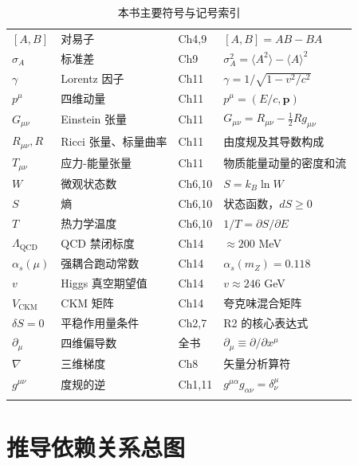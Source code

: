 \documentclass[11pt,a4paper,openany]{book}
\begin{document}
\begin{center}
\begin{longtable}{p{2cm}p{4cm}p{2cm}p{5.5cm}}
$[A,B]$ & 对易子 & Ch4,9 & $[A,B]=AB-BA$ \\
$\sigma_A$ & 标准差 & Ch9 & $\sigma_A^2=\langle A^2\rangle-\langle A\rangle^2$ \\
$\gamma$ & Lorentz 因子 & Ch11 & $\gamma=1/\sqrt{1-v^2/c^2}$ \\
$p^\mu$ & 四维动量 & Ch11 & $p^\mu=(E/c,\mathbf{p})$ \\
$G_{\mu\nu}$ & Einstein 张量 & Ch11 & $G_{\mu\nu}=R_{\mu\nu}-\frac{1}{2}Rg_{\mu\nu}$ \\
$R_{\mu\nu}, R$ & Ricci 张量、标量曲率 & Ch11 & 由度规及其导数构成 \\
$T_{\mu\nu}$ & 应力-能量张量 & Ch11 & 物质能量动量的密度和流 \\
$W$ & 微观状态数 & Ch6,10 & $S=k_B\ln W$ \\
$S$ & 熵 & Ch6,10 & 状态函数，$dS\ge 0$ \\
$T$ & 热力学温度 & Ch6,10 & $1/T=\partial S/\partial E$ \\
$\Lambda_{\text{QCD}}$ & QCD 禁闭标度 & Ch14 & $\approx 200$ MeV \\
$\alpha_s(\mu)$ & 强耦合跑动常数 & Ch14 & $\alpha_s(m_Z)=0.118$ \\
$v$ & Higgs 真空期望值 & Ch14 & $v\approx 246$ GeV \\
$V_{\text{CKM}}$ & CKM 矩阵 & Ch14 & 夸克味混合矩阵 \\
$\delta S=0$ & 平稳作用量条件 & Ch2,7 & R2 的核心表达式 \\
$\partial_\mu$ & 四维偏导数 & 全书 & $\partial_\mu\equiv\partial/\partial x^\mu$ \\
$\nabla$ & 三维梯度 & Ch8 & 矢量分析算符 \\
$g^{\mu\nu}$ & 度规的逆 & Ch1,11 & $g^{\mu\alpha}g_{\alpha\nu}=\delta^\mu_\nu$ \\
\bottomrule
\caption{本书主要符号与记号索引}
\end{longtable}
\end{center}

\chapter{推导依赖关系总图}
\label{app:graph}
\end{document}
